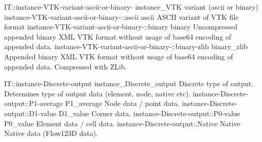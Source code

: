 \begin{SelectionType}
	{IT::instance-VTK-variant-ascii-or-binary-}
	{instance{\_}VTK variant (ascii or binary)}
	{}
		\SelectionItem
			{instance-VTK-variant-ascii-or-binary-::ascii}
			{ascii}
			{{{ASCII variant of VTK file format}%
}}
		\SelectionItem
			{instance-VTK-variant-ascii-or-binary-::binary}
			{binary}
			{{{Uncompressed appended binary XML VTK format without usage of base64 encoding of appended data.}%
}}
		\SelectionItem
			{instance-VTK-variant-ascii-or-binary-::binary-zlib}
			{binary{\_}zlib}
			{{{Appended binary XML VTK format without usage of base64 encoding of appended data.
Compressed with ZLib.}%
}}
\end{SelectionType}
\begin{SelectionType}
	{IT::instance-Discrete-output}
	{instance{\_}Discrete{\_}output}
	{{{Discrete type of output.
Determines type of output data (element, node, native etc).}%
}}
		\SelectionItem
			{instance-Discrete-output::P1-average}
			{P1{\_}average}
			{{{Node data / point data.}%
}}
		\SelectionItem
			{instance-Discrete-output::D1-value}
			{D1{\_}value}
			{{{Corner data.}%
}}
		\SelectionItem
			{instance-Discrete-output::P0-value}
			{P0{\_}value}
			{{{Element data / cell data.}%
}}
		\SelectionItem
			{instance-Discrete-output::Native}
			{Native}
			{{{Native data (Flow123D data).}%
}}
\end{SelectionType}
